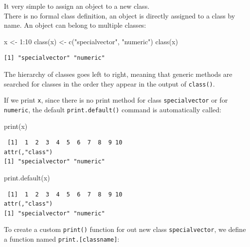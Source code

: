 \documentclass[
]{book}
\newenvironment{Shaded}{\begin{snugshade}}{\end{snugshade}}
\newcommand{\DecValTok}[1]{\textcolor[rgb]{0.00,0.00,0.81}{#1}}
\newcommand{\FunctionTok}[1]{\textcolor[rgb]{0.00,0.00,0.00}{#1}}
\newcommand{\NormalTok}[1]{#1}
\newcommand{\OtherTok}[1]{\textcolor[rgb]{0.56,0.35,0.01}{#1}}
\newcommand{\SpecialCharTok}[1]{\textcolor[rgb]{0.00,0.00,0.00}{#1}}
\newcommand{\StringTok}[1]{\textcolor[rgb]{0.31,0.60,0.02}{#1}}
\begin{document}
It very simple to assign an object to a new class.\\
There is no formal class definition, an object is directly assigned to a class by name. An object can belong to multiple classes:

\begin{Shaded}
\begin{Highlighting}[]
\NormalTok{x }\OtherTok{\textless{}{-}} \DecValTok{1}\SpecialCharTok{:}\DecValTok{10}
\FunctionTok{class}\NormalTok{(x) }\OtherTok{\textless{}{-}} \FunctionTok{c}\NormalTok{(}\StringTok{"specialvector"}\NormalTok{, }\StringTok{"numeric"}\NormalTok{)}
\FunctionTok{class}\NormalTok{(x)}
\end{Highlighting}
\end{Shaded}

\begin{verbatim}
[1] "specialvector" "numeric"      
\end{verbatim}

The hierarchy of classes goes left to right, meaning that generic methods are searched for classes in the order they appear in the output of \texttt{class()}.

If we print \texttt{x}, since there is no print method for class \texttt{specialvector} or for \texttt{numeric}, the default \texttt{print.default()} command is automatically called:

\begin{Shaded}
\begin{Highlighting}[]
\FunctionTok{print}\NormalTok{(x)}
\end{Highlighting}
\end{Shaded}

\begin{verbatim}
 [1]  1  2  3  4  5  6  7  8  9 10
attr(,"class")
[1] "specialvector" "numeric"      
\end{verbatim}

\begin{Shaded}
\begin{Highlighting}[]
\FunctionTok{print.default}\NormalTok{(x)}
\end{Highlighting}
\end{Shaded}

\begin{verbatim}
 [1]  1  2  3  4  5  6  7  8  9 10
attr(,"class")
[1] "specialvector" "numeric"      
\end{verbatim}

To create a custom \texttt{print()} function for out new class \texttt{specialvector}, we define a function named \texttt{print.{[}classname{]}}:
\end{document}
